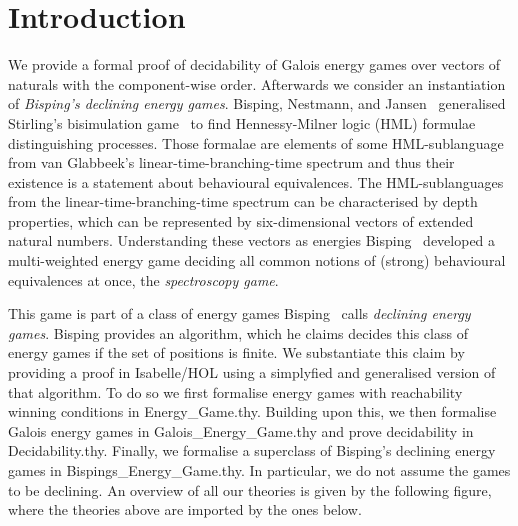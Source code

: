 \newpage
\section{Introduction}
 
\noindent
We provide a formal proof of decidability of Galois energy games over vectors of naturals with the component-wise order. 
Afterwards we consider an instantiation of \textit{Bisping's declining energy games}.
Bisping, Nestmann, and Jansen~\cite{bispingNestmann,bispingJansenNestmann} generalised 
Stirling's bisimulation game~\cite{stirling-bisim} to find Hennessy-Milner logic (HML) formulae distinguishing 
processes. Those formalae are elements of some HML-sublanguage from 
van Glabbeek’s linear-time-branching-time spectrum\cite{vanGlabbeek} 
and thus their existence is a statement about behavioural equivalences.
The HML-sublanguages from the linear-time-branching-time spectrum can be characterised by depth properties, 
which can be represented by six-dimensional vectors of extended natural numbers. Understanding these 
vectors as energies Bisping~\cite{bens-algo} developed a multi-weighted energy game deciding all common 
notions of (strong) behavioural equivalences at once, the \textit{spectroscopy game}. 

This game is part of a class of energy games Bisping~\cite{bens-algo} calls \textit{declining energy games}.
Bisping provides an algorithm, which he claims decides this class of energy games if the set of positions is finite.
We substantiate this claim by providing a proof in Isabelle/HOL using a simplyfied and generalised version of that algorithm.
To do so we first formalise energy games with reachability winning conditions in Energy\_Game.thy. 
Building upon this, we then formalise Galois energy games in Galois\_Energy\_Game.thy and prove decidability in Decidability.thy.
Finally, we formalise a superclass of Bisping's declining energy games in Bispings\_Energy\_Game.thy. In particular, we do not assume the games to be declining.
An overview of all our theories is given by the following figure, where the theories above are imported by the ones below.

